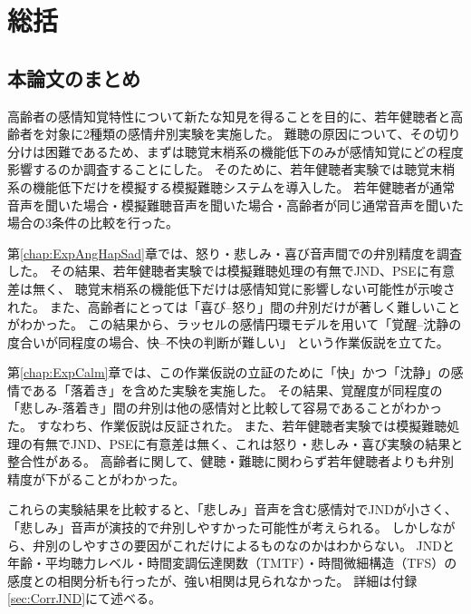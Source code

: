 \chapter{総括}
\section{本論文のまとめ}
\label{sec:Summary}
高齢者の感情知覚特性について新たな知見を得ることを目的に、若年健聴者と高齢者を対象に2種類の感情弁別実験を実施した。
難聴の原因について、その切り分けは困難であるため、まずは聴覚末梢系の機能低下のみが感情知覚にどの程度影響するのか調査することにした。
そのために、若年健聴者実験では聴覚末梢系の機能低下だけを模擬する模擬難聴システムを導入した。
若年健聴者が通常音声を聞いた場合・模擬難聴音声を聞いた場合・高齢者が同じ通常音声を聞いた場合の3条件の比較を行った。

第\ref{chap:ExpAngHapSad}章では、怒り・悲しみ・喜び音声間での弁別精度を調査した。
その結果、若年健聴者実験では模擬難聴処理の有無でJND、PSEに有意差は無く、
聴覚末梢系の機能低下だけは感情知覚に影響しない可能性が示唆された。
また、高齢者にとっては「喜び–怒り」間の弁別だけが著しく難しいことがわかった。
この結果から、ラッセルの感情円環モデルを用いて「覚醒–沈静の度合いが同程度の場合、快–不快の判断が難しい」
という作業仮説を立てた。

第\ref{chap:ExpCalm}章では、この作業仮説の立証のために「快」かつ「沈静」の感情である「落着き」を含めた実験を実施した。
その結果、覚醒度が同程度の「悲しみ-落着き」間の弁別は他の感情対と比較して容易であることがわかった。
すなわち、作業仮説は反証された。
また、若年健聴者実験では模擬難聴処理の有無でJND、PSEに有意差は無く、これは怒り・悲しみ・喜び実験の結果と整合性がある。
高齢者に関して、健聴・難聴に関わらず若年健聴者よりも弁別精度が下がることがわかった。

これらの実験結果を比較すると、「悲しみ」音声を含む感情対でJNDが小さく、「悲しみ」音声が演技的で弁別しやすかった可能性が考えられる。
しかしながら、弁別のしやすさの要因がこれだけによるものなのかはわからない。
JNDと年齢・平均聴力レベル・時間変調伝達関数（TMTF）・時間微細構造（TFS）の感度との相関分析も行ったが、強い相関は見られなかった。
詳細は付録\ref{sec:CorrJND}にて述べる。



